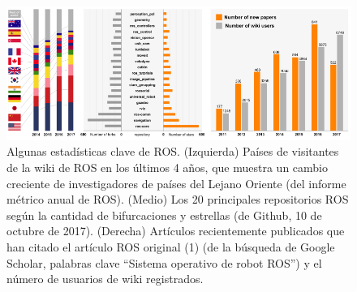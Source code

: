             \begin{figure}[htb]
                \centering
                \includegraphics[width=1.0\linewidth]{Main/Chapter3/Images3/science_robot_esta_1.png}
                \caption{Algunas estadísticas clave de ROS. (Izquierda) Países de visitantes de la wiki de ROS en los últimos 4 años, que muestra un cambio creciente de investigadores de países del Lejano Oriente (del informe métrico anual de ROS). (Medio) Los 20 principales repositorios ROS según la cantidad de bifurcaciones y estrellas (de Github, 10 de octubre de 2017). (Derecha) Artículos recientemente publicados que han citado el artículo ROS original (1) (de la búsqueda de Google Scholar, palabras clave “Sistema operativo de robot ROS”) y el número de usuarios de wiki registrados.}
                \label{f:Cap3-5_estadisticas_1}
            \end{figure}        
        
        
    \newpage

